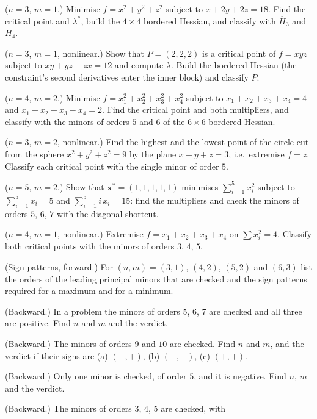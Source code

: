 \begin{problems}
  \item ($n=3$, $m=1$.) Minimise $f=x^{2}+y^{2}+z^{2}$ subject to
        $x+2y+2z=18$. Find the critical point and $\lambda^*$, build the
        $4\times4$ bordered Hessian, and classify with $\overline{H}_3$ and
        $\overline{H}_4$.
  \item ($n=3$, $m=1$, nonlinear.) Show that $P=(2,2,2)$ is a critical
        point of $f=xyz$ subject to $xy+yz+zx=12$ and compute $\lambda$.
        Build the bordered Hessian (the constraint's second derivatives
        enter the inner block) and classify $P$.
  \item ($n=4$, $m=2$.) Minimise $f=x_1^{2}+x_2^{2}+x_3^{2}+x_4^{2}$
        subject to $x_1+x_2+x_3+x_4=4$ and $x_1-x_2+x_3-x_4=2$. Find the
        critical point and both multipliers, and classify with the minors of
        orders $5$ and $6$ of the $6\times6$ bordered Hessian.
  \item ($n=3$, $m=2$, nonlinear.) Find the highest and the lowest point
        of the circle cut from the sphere $x^{2}+y^{2}+z^{2}=9$ by the plane
        $x+y+z=3$, i.e.\ extremise $f=z$. Classify each critical point with
        the single minor of order $5$.
  \item ($n=5$, $m=2$.) Show that $\mathbf{x}^*=(1,1,1,1,1)$ minimises
        $\sum_{i=1}^{5}x_i^{2}$ subject to $\sum_{i=1}^{5}x_i=5$ and
        $\sum_{i=1}^{5}i\,x_i=15$: find the multipliers and check the minors
        of orders $5$, $6$, $7$ with the diagonal shortcut.
  \item ($n=4$, $m=1$, nonlinear.) Extremise
        $f=x_1+x_2+x_3+x_4$ on $\sum x_i^{2}=4$. Classify both critical
        points with the minors of orders $3$, $4$, $5$.
  \item (Sign patterns, forward.) For $(n,m)=(3,1)$, $(4,2)$, $(5,2)$ and
        $(6,3)$ list the orders of the leading principal minors that are
        checked and the sign patterns required for a maximum and for a
        minimum.
  \item (Backward.) In a problem the minors of orders $5$, $6$, $7$ are
        checked and all three are positive. Find $n$ and $m$ and the
        verdict.
  \item (Backward.) The minors of orders $9$ and $10$ are checked. Find $n$
        and $m$, and the verdict if their signs are (a) $(-,+)$,
        (b) $(+,-)$, (c) $(+,+)$.
  \item (Backward.) Only one minor is checked, of order $5$, and it is
        negative. Find $n$, $m$ and the verdict.
  \item (Backward.) The minors of orders $3$, $4$, $5$ are checked, with

\end{problems}

